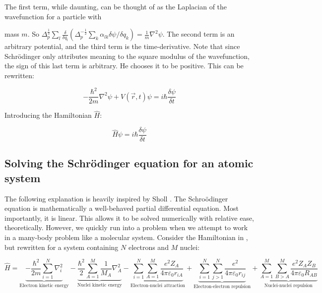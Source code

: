 The first term, while daunting, can be thought of as the Laplacian of the
wavefunction for a particle with \par
\noindent mass $m$.
So $\Delta _p^{\frac{1}{3}} \sum_l \frac{\delta}{\delta q_l}
\left(\Delta_p^{-\frac{1}{2}}\sum_k\alpha_{lk} \delta\psi/\delta
q_k\right) = \frac{1}{m}\nabla^2 \psi$. The second term is an
arbitrary potential, and
the third term is the time-derivative. Note that since Schr\"odinger
only attributes meaning to the square modulus of the wavefunction,
the sign of this last term is arbitrary. He chooses it to be positive.
This can be rewritten:

\begin{equation}
  -\frac{\hbar^2}{2m}\nabla^2 \psi
  + V(\vec r, t)\psi  = i\hbar\frac{\delta \psi}{\delta t}
\end{equation}

Introducing the Hamiltonian $\hat H$:

\begin{equation}
  \hat H\psi  = i\hbar\frac{\delta \psi}{\delta t}
  \label{eq:tdse}
\end{equation}

\subsection{Solving the Schr\"odinger equation for an atomic system}

The following explanation is heavily inspired by Sholl \cite{sholl}.
The Schro\"odinger equation is mathematically a well-behaved partial
differential equation. Most importantly, it is linear. This allows it to
be solved numerically with relative ease, theoretically. However, we quickly
run into a problem when we attempt to work in a many-body problem like
a molecular system. Consider the Hamiltonian in
, but rewritten for a system containing $N$ electrons
and $M$ nuclei:

\begin{equation}
  \hat H =
  \underbrace{
    -\frac{\hbar^2}{2m}\sum_{i=1}^N\nabla_i^2
  }_{\text{Electron kinetic energy}} -
  \underbrace{
    \frac{\hbar^2}{2}\sum_{A = 1}^M\frac{1}{M_A}\nabla_A^2
  }_{\text{Nuclei kinetic energy}} -
  \underbrace{\sum_{i=1}^N\sum_{A=1}^M \frac{e^2Z_A}{4\pi \varepsilon_0r_{iA}}
  }_{\text{Electron-nuclei attraction}} +
  \underbrace{\sum_{i = 1}^N \sum_{j > 1}^N \frac{e^2}{4\pi \varepsilon_0r_{ij}}
  }_{\text{Electron-electron repulsion}} +
  \underbrace{
    \sum_{A = 1}^M \sum_{B>A}^M \frac{e^2Z_AZ_B}{4\pi \varepsilon_0R_{AB}}
  }_{\text{Nuclei-nuclei repulsion}}
\end{equation}

